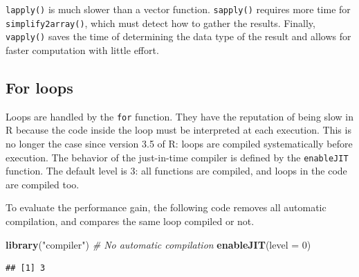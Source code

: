 \documentclass[
  12pt,
  american,
  a4paper,
  extrafontsizes,onecolumn,openright
  ]{memoir}
\newenvironment{Shaded}{\begin{snugshade}}{\end{snugshade}}
\newcommand{\AttributeTok}[1]{\textcolor[rgb]{0.13,0.29,0.53}{#1}}
\newcommand{\CommentTok}[1]{\textcolor[rgb]{0.56,0.35,0.01}{\textit{#1}}}
\newcommand{\DecValTok}[1]{\textcolor[rgb]{0.00,0.00,0.81}{#1}}
\newcommand{\FunctionTok}[1]{\textcolor[rgb]{0.13,0.29,0.53}{\textbf{#1}}}
\newcommand{\NormalTok}[1]{#1}
\newcommand{\StringTok}[1]{\textcolor[rgb]{0.31,0.60,0.02}{#1}}
\newlength{\rf}
\begin{document}
\normalsize

\texttt{lapply()} is much slower than a vector function.
\texttt{sapply()} requires more time for \texttt{simplify2array()}, which must detect how to gather the results.
Finally, \texttt{vapply()} saves the time of determining the data type of the result and allows for faster computation with little effort.

\subsection{For loops}\label{for-loops}

Loops are handled by the \texttt{for} function.
They have the reputation of being slow in R because the code inside the loop must be interpreted at each execution.
This is no longer the case since version 3.5 of R: loops are compiled systematically before execution.
The behavior of the just-in-time compiler is defined by the \texttt{enableJIT} function.
The default level is 3: all functions are compiled, and loops in the code are compiled too.

To evaluate the performance gain, the following code removes all automatic compilation, and compares the same loop compiled or not.

\scriptsize

\begin{Shaded}
\begin{Highlighting}[]
\FunctionTok{library}\NormalTok{(}\StringTok{"compiler"}\NormalTok{)}
\CommentTok{\# No automatic compilation}
\FunctionTok{enableJIT}\NormalTok{(}\AttributeTok{level =} \DecValTok{0}\NormalTok{)}
\end{Highlighting}
\end{Shaded}

\begin{verbatim}
## [1] 3
\end{verbatim}
\end{document}
